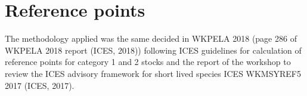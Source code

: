 \documentclass[review]{elsarticle}
\begin{document}
 



\section{Reference points}

The methodology applied was the same decided in WKPELA 2018 (page 286 of WKPELA 2018 report (ICES, 2018)) following ICES guidelines for calculation of reference points for category 1 and 2 stocks and the report of the workshop to review the ICES advisory framework for short lived species ICES WKMSYREF5 2017 (ICES, 2017).
\end{document}
